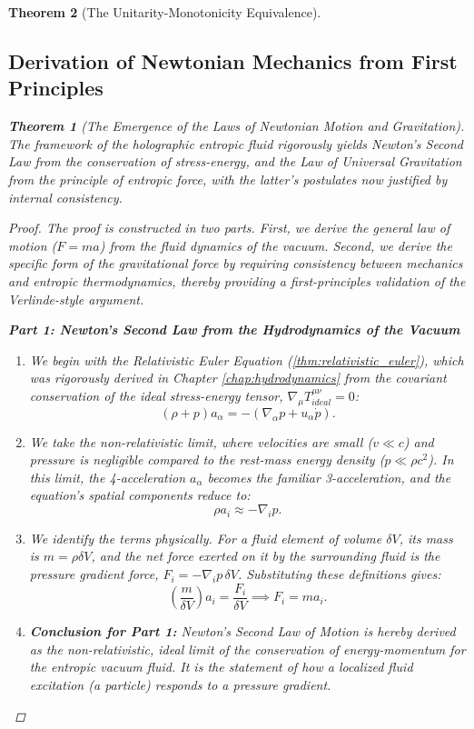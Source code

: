 \documentclass[11pt, letterpaper]{report}
\theoremstyle{plain} %
\newtheorem{theorem}{Theorem}[chapter]
\theoremstyle{definition} %
\theoremstyle{remark} %
\begin{document}
\begin{theorem}[The Unitarity-Monotonicity Equivalence]
\subsection{Derivation of Newtonian Mechanics from First Principles}
\label{subsec:newtonian_first_principles}

\begin{theorem}[The Emergence of the Laws of Newtonian Motion and Gravitation]
\label{thm:derive_newton_full}
The framework of the holographic entropic fluid rigorously yields Newton's Second Law from the conservation of stress-energy, and the Law of Universal Gravitation from the principle of entropic force, with the latter's postulates now justified by internal consistency.
\end{theorem}
\begin{proof}
The proof is constructed in two parts. First, we derive the general law of motion ($F=ma$) from the fluid dynamics of the vacuum. Second, we derive the specific form of the gravitational force by requiring consistency between mechanics and entropic thermodynamics, thereby providing a first-principles validation of the Verlinde-style argument.

\textbf{Part 1: Newton's Second Law from the Hydrodynamics of the Vacuum}
\begin{enumerate}
    \item We begin with the Relativistic Euler Equation (\cref{thm:relativistic_euler}), which was rigorously derived in Chapter \ref{chap:hydrodynamics} from the covariant conservation of the ideal stress-energy tensor, $\nabla_\mu T^{\mu\nu}_{ideal} = 0$:
    \begin{equation}
        (\rho+p)a_\alpha = -(\nabla_\alpha p + u_\alpha \dot{p}).
    \end{equation}
    \item We take the non-relativistic limit, where velocities are small ($v \ll c$) and pressure is negligible compared to the rest-mass energy density ($p \ll \rho c^2$). In this limit, the 4-acceleration $a_\alpha$ becomes the familiar 3-acceleration, and the equation's spatial components reduce to:
    \begin{equation}
        \rho a_i \approx -\nabla_i p.
    \end{equation}
    \item We identify the terms physically. For a fluid element of volume $\delta V$, its mass is $m = \rho \delta V$, and the net force exerted on it by the surrounding fluid is the pressure gradient force, $F_i = -\nabla_i p \, \delta V$. Substituting these definitions gives:
    $$ \left(\frac{m}{\delta V}\right) a_i = \frac{F_i}{\delta V} \implies F_i = m a_i. $$
    \item \textbf{Conclusion for Part 1:} Newton's Second Law of Motion is hereby derived as the non-relativistic, ideal limit of the conservation of energy-momentum for the entropic vacuum fluid. It is the statement of how a localized fluid excitation (a particle) responds to a pressure gradient.
\end{enumerate}


\end{proof}
\end{theorem}
\end{document}
